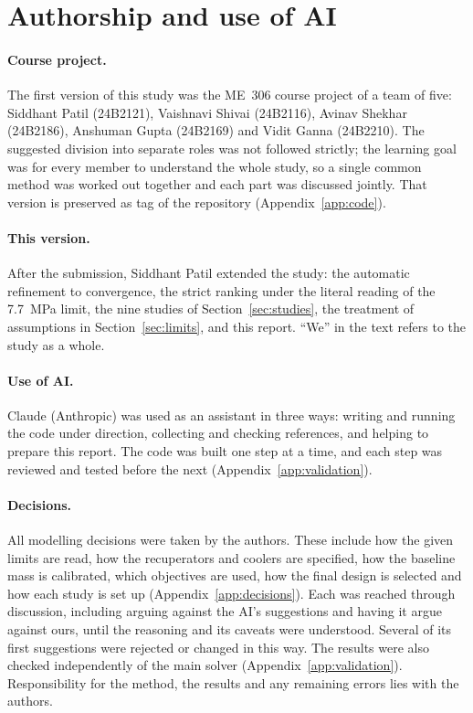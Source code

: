 \section{Authorship and use of AI}\label{app:contrib}

\paragraph{Course project.} The first version of this study was the ME~306 course project of a team of five: Siddhant Patil (24B2121), Vaishnavi Shivai (24B2116), Avinav Shekhar (24B2186), Anshuman Gupta (24B2169) and Vidit Ganna (24B2210). The suggested division into separate roles was not followed strictly; the learning goal was for every member to understand the whole study, so a single common method was worked out together and each part was discussed jointly. That version is preserved as tag  of the repository (Appendix~\ref{app:code}).

\paragraph{This version.} After the submission, Siddhant Patil extended the study: the automatic refinement to convergence, the strict ranking under the literal reading of the \SI{7.7}{MPa} limit, the nine studies of Section~\ref{sec:studies}, the treatment of assumptions in Section~\ref{sec:limits}, and this report. ``We'' in the text refers to the study as a whole.

\paragraph{Use of AI.} Claude (Anthropic) was used as an assistant in three ways: writing and running the code under direction, collecting and checking references, and helping to prepare this report. The code was built one step at a time, and each step was reviewed and tested before the next (Appendix~\ref{app:validation}).

\paragraph{Decisions.} All modelling decisions were taken by the authors. These include how the given limits are read, how the recuperators and coolers are specified, how the baseline mass is calibrated, which objectives are used, how the final design is selected and how each study is set up (Appendix~\ref{app:decisions}). Each was reached through discussion, including arguing against the AI's suggestions and having it argue against ours, until the reasoning and its caveats were understood. Several of its first suggestions were rejected or changed in this way. The results were also checked independently of the main solver (Appendix~\ref{app:validation}). Responsibility for the method, the results and any remaining errors lies with the authors.
